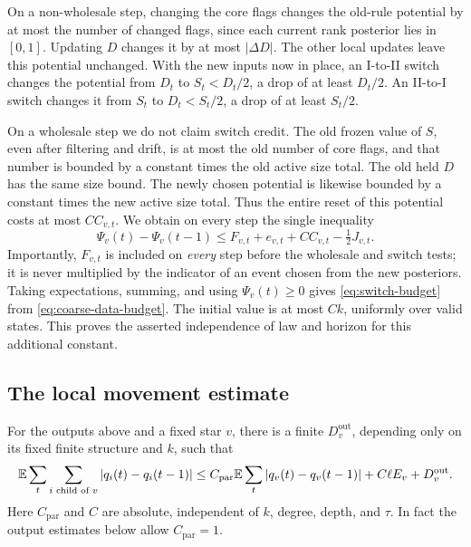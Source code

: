 On a non-wholesale step, changing the core flags changes the old-rule
potential by at most the number of changed flags, since each current
rank posterior lies in \([0,1]\).  Updating \(D\) changes it by at most
\(|\Delta D|\).  The other local updates leave this potential unchanged.
With the new inputs now in place, an I-to-II switch changes the potential
from \(D_t\) to \(S_t<D_t/2\), a drop of at least \(D_t/2\).
An II-to-I switch changes it from \(S_t\) to \(D_t<S_t/2\), a drop
of at least \(S_t/2\).

On a wholesale step we do not claim switch credit.  The old frozen
value of \(S\), even after filtering and drift, is at most the old
number of core flags, and that number is bounded by a constant times
the old active size total.  The old held \(D\) has the same size bound.
The newly chosen potential is likewise bounded by a constant times
the new active size total.  Thus the entire reset of this potential
costs at most \(C C_{v,t}\).  We obtain on every step the single
inequality
\begin{equation}
 \Psi_v(t)-\Psi_v(t-1)
 \le F_{v,t}+e_{v,t}+C C_{v,t}-\tfrac12 J_{v,t}.
 \label{eq:switch-one-step}
\end{equation}
Importantly, \(F_{v,t}\) is included on \emph{every} step before the
wholesale and switch tests; it is never multiplied by the indicator
of an event chosen from the new posteriors.  Taking expectations,
summing, and using \(\Psi_v(t)\ge0\) gives
\eqref{eq:switch-budget} from \eqref{eq:coarse-data-budget}.
The initial value is at most \(Ck\), uniformly over valid states.
This proves the asserted independence of law and horizon for this
additional constant.

\subsection{The local movement estimate}

\begin{lemma}
\label{lem:star-movement}
For the outputs above and a fixed star \(v\), there is a finite
\(D_v^{\mathrm{out}}\), depending only on its fixed finite structure
and \(k\), such that
\begin{equation}
 \mathbb E\sum_t\sum_{i\text{ child of }v}|q_i(t)-q_i(t-1)|
 \le C_{\mathrm{par}}\mathbb E\sum_t|q_v(t)-q_v(t-1)|
       +C\ell E_v+D_v^{\mathrm{out}}.
 \label{eq:star-output-movement}
\end{equation}
Here \(C_{\mathrm{par}}\) and \(C\) are absolute, independent of
\(k\), degree, depth, and \(\tau\).  In fact the output estimates
below allow \(C_{\mathrm{par}}=1\).
\end{lemma}

